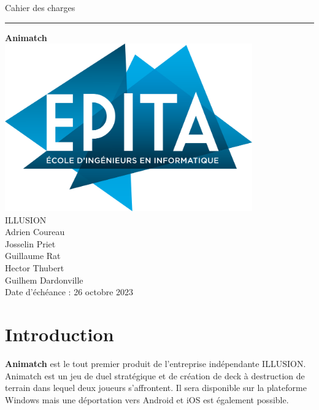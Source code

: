 \documentclass[12pt,a4paper]{article}
\begin{document}
\begin{titlepage}
\linespread{1}


\begin{center}

\huge Cahier des charges
\begin{center}
\rule{0.5\linewidth}{1pt}
\end{center}
\huge \textbf{Animatch}\\
\vspace{48pt}
\includegraphics[width = 0.8\textwidth]{images/Epita.png}
\centering\\
\vspace{48pt}
\large ILLUSION \\
\vspace{12pt}
Adrien Coureau\\
Josselin Priet\\
Guillaume Rat\\
Hector Thubert \\
Guilhem Dardonville\\
\vspace{36pt}
Date d'échéance : 26 octobre 2023 \\

\end{center}

\end{titlepage}
\linespread{1.6}

\setcounter{page}{0}
\tableofcontents
\clearpage

\section{Introduction}
\textbf{Animatch} est le tout premier produit de l'entreprise indépendante ILLUSION. Animatch est un jeu de duel stratégique et de création de deck à destruction de terrain dans lequel deux joueurs s'affrontent. Il sera disponible sur la plateforme Windows mais une déportation vers Android et iOS est également possible. 
\end{document}
